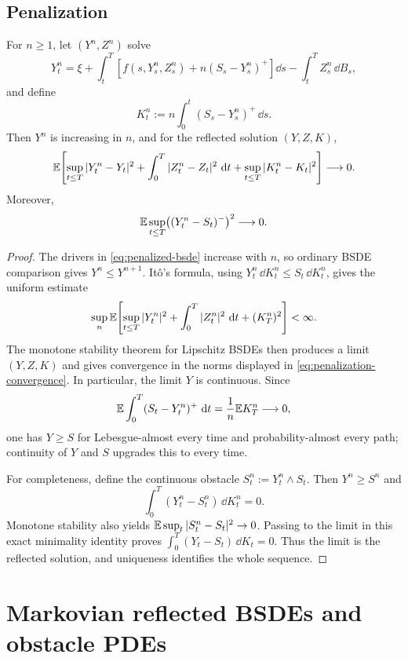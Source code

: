 \subsection{Penalization}

\begin{theorem}
For $n\geq1$, let $(Y^n,Z^n)$ solve
\begin{equation}
  Y_t^n
  =\xi+\int_t^T
      \left[f(s,Y_s^n,Z_s^n)+n(S_s-Y_s^n)^+\right]\dd s
      -\int_t^T Z_s^n\,\dd B_s, \label{eq:penalized-bsde}
\end{equation}
and define
\[
  K_t^n:=n\int_0^t(S_s-Y_s^n)^+\,\dd s.
\]
Then $Y^n$ is increasing in $n$, and for the reflected solution $(Y,Z,K)$,
\begin{equation}
  \mathbb E\!\left[
    \sup_{t\leq T}|Y_t^n-Y_t|^2
    +\int_0^T|Z_t^n-Z_t|^2\,\mathop{}\!\mathrm d t
    +\sup_{t\leq T}|K_t^n-K_t|^2
  \right]\longrightarrow0. \label{eq:penalization-convergence}
\end{equation}
Moreover,
\[
  \mathbb E\sup_{t\leq T}\bigl((Y_t^n-S_t)^-\bigr)^2\longrightarrow0.
\]
\end{theorem}

\begin{proof}
The drivers in \eqref{eq:penalized-bsde} increase with $n$, so ordinary BSDE
comparison gives $Y^n\leq Y^{n+1}$. It\^o's formula, using
$Y_t^n\,\dd K_t^n\leq S_t\,\dd K_t^n$, gives the uniform estimate
\[
  \sup_n\mathbb E\!\left[
    \sup_{t\leq T}|Y_t^n|^2
    +\int_0^T|Z_t^n|^2\,\mathop{}\!\mathrm d t+(K_T^n)^2
  \right]<\infty.
\]
The monotone stability theorem for Lipschitz BSDEs then produces a limit
$(Y,Z,K)$ and gives convergence in the norms displayed in
\eqref{eq:penalization-convergence}. In particular, the limit $Y$ is
continuous. Since
\[
  \mathbb E\int_0^T(S_t-Y_t^n)^+\,\mathop{}\!\mathrm d t
  =\frac1n\mathbb E K_T^n\longrightarrow0,
\]
one has $Y\geq S$ for Lebesgue-almost every time and probability-almost every
path; continuity of $Y$ and $S$ upgrades this to every time.

For completeness, define the continuous obstacle
$S_t^n:=Y_t^n\wedge S_t$. Then $Y^n\geq S^n$ and
\[
  \int_0^T(Y_t^n-S_t^n)\,\dd K_t^n=0.
\]
Monotone stability also yields
$\mathbb E\sup_t|S_t^n-S_t|^2\to0$. Passing to the limit in this exact minimality
identity proves
$\int_0^T(Y_t-S_t)\,\dd K_t=0$. Thus the limit is the reflected solution,
and uniqueness identifies the whole sequence.
\end{proof}

\section{Markovian reflected BSDEs and obstacle PDEs}

